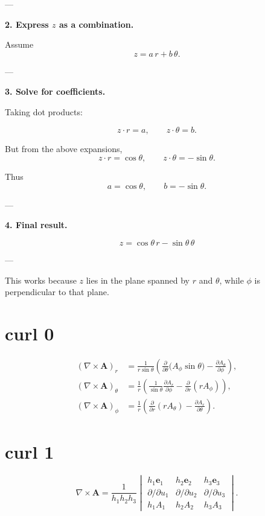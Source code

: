\documentclass{article}
\def\hat#1{#1}%
\def\dfrac#1#2{#1/#2}%
\begin{document}
---

\textbf{2. Express $\hat{z}$ as a combination.}

Assume
\[
\hat{z} = a \, \hat{r} + b \, \hat{\theta}.
\]

---

\textbf{3. Solve for coefficients.}

Taking dot products:

\[
\hat{z}\cdot \hat{r} = a, 
\qquad
\hat{z}\cdot \hat{\theta} = b.
\]

But from the above expansions,
\[
\hat{z}\cdot \hat{r} = \cos\theta,
\qquad
\hat{z}\cdot \hat{\theta} = -\sin\theta.
\]

Thus
\[
a = \cos\theta, 
\qquad 
b = -\sin\theta.
\]

---

\textbf{4. Final result.}

\[
\boxed{\hat{z} = \cos\theta \, \hat{r} - \sin\theta \, \hat{\theta}}
\]

---

This works because $\hat{z}$ lies in the plane spanned by $\hat{r}$ and $\hat{\theta}$, while $\hat{\phi}$ is perpendicular to that plane.
\section*{curl 0}
\[
\begin{aligned}
(\nabla \times \mathbf{A})_r 
&= \frac{1}{r \sin\theta} 
\left( \frac{\partial}{\partial \theta} \big( A_\phi \sin\theta \big) 
- \frac{\partial A_\theta}{\partial \phi} \right),
\\[8pt]
(\nabla \times \mathbf{A})_\theta 
&= \frac{1}{r} 
\left( \frac{1}{\sin\theta}\frac{\partial A_r}{\partial \phi} 
- \frac{\partial}{\partial r} (r A_\phi) \right),
\\[8pt]
(\nabla \times \mathbf{A})_\phi 
&= \frac{1}{r} 
\left( \frac{\partial}{\partial r} (r A_\theta) 
- \frac{\partial A_r}{\partial \theta} \right).
\end{aligned}
\]
\section*{curl 1}
\[
\nabla \times \mathbf{A}
= \frac{1}{h_1 h_2 h_3}
\begin{vmatrix}
h_1 \hat{\mathbf e}_1 & h_2 \hat{\mathbf e}_2 & h_3 \hat{\mathbf e}_3 \\
\dfrac{\partial}{\partial u_1} & \dfrac{\partial}{\partial u_2} & \dfrac{\partial}{\partial u_3} \\
h_1 A_1 & h_2 A_2 & h_3 A_3
\end{vmatrix}.
\]
\end{document}
